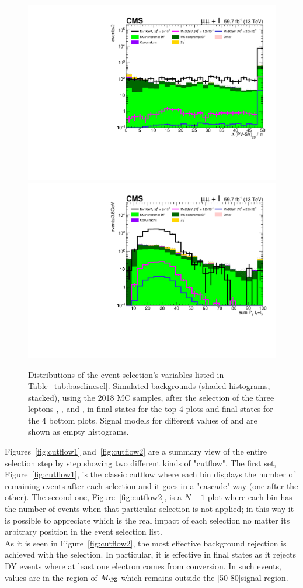 \begin{figure}[h]
  \includegraphics[clip,trim=0.9cm 0.7cm 0.7cm 0.6cm,width=.35\textwidth]{Figures/c6/selection/18/mu_sigmaDeltaPV_SV_2D__0.pdf}
  \includegraphics[clip,trim=0.9cm 0.7cm 0.7cm 0.6cm,width=.35\textwidth]{Figures/c6/selection/18/mu_sum_Pt_L2L3__0.pdf}
  \caption{Distributions of the event selection's variables listed in
    Table~\ref{tab:baselinesel}. Simulated backgrounds (shaded histograms, stacked),
    using the 2018 MC samples, 
    after the selection of the three leptons \lone, \ltwo, and \lthree,
    in \eex final states for the top 4 plots and \mmx final states for
    the 4 bottom plots.
    Signal models for different values of \mhnl and \mixpar are shown
    as empty histograms.}
  \label{fig:selection_electrons}
\end{figure}


\clearpage
Figures~\ref{fig:cutflow1} and~\ref{fig:cutflow2} are a summary view of the entire selection
step by step showing two different kinds of "cutflow". The
first set, Figure~\ref{fig:cutflow1}, is the classic cutflow where each
bin displays the number of remaining events after each selection and it goes in a
"cascade" way (one after the other). The second one,
Figure~\ref{fig:cutflow2}, is a $N-1$ plot where each bin has the number
of events when that particular selection is not applied; in this way it is
possible to appreciate which is the real impact of each selection no matter
its arbitrary position in the event selection list. \\
As it is seen in Figure~\ref{fig:cutflow2}, the most effective
background rejection is achieved with the \mthreel selection. In
particular, it is effective in \eex final states as it rejects DY events
where at least one electron comes from conversion. In such events,
\mthreel values are in the region of $M_{\PZ}$ which remains outside the
[50-80]\GeV signal region.

